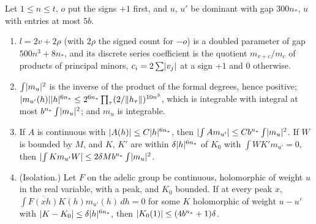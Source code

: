 \begin{lemma}\label{lem:holomorphic-integrals}
Let $1\le n\le t$, $o$ put the signs $+1$ first, and $u$, $u'$ be dominant with gap $300n_*$, $u$ with entries at most $5b$.
\begin{enumerate}[label=\textup{(\alph*)}]
\item $l=2v+2\rho$ (with $2\rho$ the signed count for $-o$) is a doubled parameter of gap $500n^3+8n_*$, and its discrete series coefficient is the quotient $m_{v+c}/m_c$ of products of principal minors, $c_i=2\sum\lvert v_j\rvert$ at a sign $+1$ and $0$
otherwise.
\item $\int\lvert m_u\rvert^2$ is the inverse of the product of the formal degrees, hence positive; $\lvert m_{u'}(h)\rvert\lvert h\rvert^{6n_*}\le2^{6n_*}\prod_\tau(2/\lVert h_\tau\rVert)^{10n^3}$, which is integrable with integral at most $b^{n_*}\int\lvert m_u\rvert^2$; and $m_u$ is integrable.
\item If $A$ is continuous with $\lvert A(h)\rvert\le C\lvert h\rvert^{6n_*}$, then $\lvert \int Am_{u'}\rvert\le Cb^{n_*}\int\lvert m_u\rvert^2$. If $W$ is bounded by $M$, and $K$, $K'$ are within $\delta\lvert h\rvert^{6n_*}$ of $K_0$ with $\int WK'm_{u'}=0$, then
$\lvert \int Km_{u'}W\rvert\le2\delta Mb^{n_*}\int\lvert m_u\rvert^2$.
\item (Isolation.) Let $F$ on the adelic group be continuous, holomorphic of weight $u$ in the real variable, with a peak, and $K_0$ bounded. If at every peak $x$, $\int\overline{F(xh)}K(h)m_{u'}(h)\,dh=0$ for some $K$ holomorphic of weight $u-u'$ with
$\lvert K-K_0\rvert\le\delta\lvert h\rvert^{6n_*}$, then $\lvert K_0(1)\rvert\le(4b^{n_*}+1)\delta$.
\end{enumerate}
\end{lemma}

